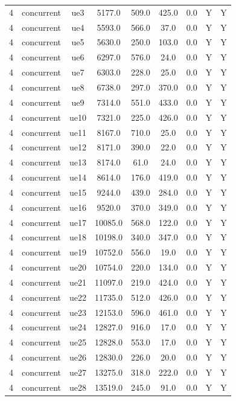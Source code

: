 \begin{table}[ht]
\begin{tabular}{|c|c|c|c|c|c|c|c|c|}
4 & concurrent & ue3 & 5177.0 & 509.0 & 425.0 & 0.0 & Y & Y \\
4 & concurrent & ue4 & 5593.0 & 566.0 & 37.0 & 0.0 & Y & Y \\
4 & concurrent & ue5 & 5630.0 & 250.0 & 103.0 & 0.0 & Y & Y \\
4 & concurrent & ue6 & 6297.0 & 576.0 & 24.0 & 0.0 & Y & Y \\
4 & concurrent & ue7 & 6303.0 & 228.0 & 25.0 & 0.0 & Y & Y \\
4 & concurrent & ue8 & 6738.0 & 297.0 & 370.0 & 0.0 & Y & Y \\
4 & concurrent & ue9 & 7314.0 & 551.0 & 433.0 & 0.0 & Y & Y \\
4 & concurrent & ue10 & 7321.0 & 225.0 & 426.0 & 0.0 & Y & Y \\
4 & concurrent & ue11 & 8167.0 & 710.0 & 25.0 & 0.0 & Y & Y \\
4 & concurrent & ue12 & 8171.0 & 390.0 & 22.0 & 0.0 & Y & Y \\
4 & concurrent & ue13 & 8174.0 & 61.0 & 24.0 & 0.0 & Y & Y \\
4 & concurrent & ue14 & 8614.0 & 176.0 & 419.0 & 0.0 & Y & Y \\
4 & concurrent & ue15 & 9244.0 & 439.0 & 284.0 & 0.0 & Y & Y \\
4 & concurrent & ue16 & 9520.0 & 370.0 & 349.0 & 0.0 & Y & Y \\
4 & concurrent & ue17 & 10085.0 & 568.0 & 122.0 & 0.0 & Y & Y \\
4 & concurrent & ue18 & 10198.0 & 340.0 & 347.0 & 0.0 & Y & Y \\
4 & concurrent & ue19 & 10752.0 & 556.0 & 19.0 & 0.0 & Y & Y \\
4 & concurrent & ue20 & 10754.0 & 220.0 & 134.0 & 0.0 & Y & Y \\
4 & concurrent & ue21 & 11097.0 & 219.0 & 424.0 & 0.0 & Y & Y \\
4 & concurrent & ue22 & 11735.0 & 512.0 & 426.0 & 0.0 & Y & Y \\
4 & concurrent & ue23 & 12153.0 & 596.0 & 461.0 & 0.0 & Y & Y \\
4 & concurrent & ue24 & 12827.0 & 916.0 & 17.0 & 0.0 & Y & Y \\
4 & concurrent & ue25 & 12828.0 & 553.0 & 17.0 & 0.0 & Y & Y \\
4 & concurrent & ue26 & 12830.0 & 226.0 & 20.0 & 0.0 & Y & Y \\
4 & concurrent & ue27 & 13275.0 & 318.0 & 222.0 & 0.0 & Y & Y \\
4 & concurrent & ue28 & 13519.0 & 245.0 & 91.0 & 0.0 & Y & Y \\

\end{tabular}
\end{table}

